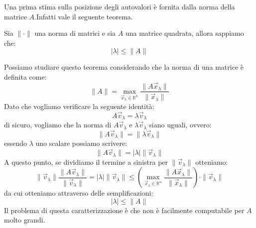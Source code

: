 Una prima stima sulla posizione degli autovalori è fornita dalla norma della
matrice $A$.Infatti vale il seguente teorema.
\begin{teorema}
    Sia $\|\cdot\|$ una norma di matrici e sia $A$ una matrice quadrata, allora
    sappiamo che:
    \begin{equation*}
        |\lambda| \leq \|A\|
    \end{equation*}
\end{teorema}
Possiamo studiare questo teorema considerando che la norma di una matrice è
definita come:
\begin{equation*}
    \|A\| = \max_{\vec{x}_\lambda \in \mathbb{R}^n} \frac{\|A\vec{x}_\lambda\|}{\|\vec{x}_\lambda\|}
\end{equation*}
Dato che vogliamo verificare la seguente identità:
\begin{equation*}
    A\vec{v}_\lambda = \lambda \vec{v}_\lambda
\end{equation*}
di sicuro, vogliamo che la norma di $A \vec{v}_\lambda$ e $\lambda \vec{v}_\lambda$
siano uguali, ovvero:
\begin{equation*}
    \|A\vec{v}_\lambda\| = \|\lambda \vec{v}_\lambda\|
\end{equation*}
essendo $\lambda$ uno scalare possiamo scrivere:
\begin{equation*}
    \|A\vec{v}_\lambda\| = |\lambda| \|\vec{v}_\lambda\|
\end{equation*}
A questo punto, se dividiamo il termine a sinistra per $\|\vec{v}_\lambda\|$ otteniamo:
\begin{equation*}
    \|\vec{v}_\lambda\| \frac{\|A\vec{v}_\lambda\|}{\|\vec{v}_\lambda\|} = |\lambda| \|\vec{v}_\lambda\|
    \leq \left(\max_{\vec{x}_\lambda \in \mathbb{R}^n} \frac{\|A\vec{x}_\lambda\|}{\|\vec{x}_\lambda\|}\right) \cdot \|\vec{v}_\lambda\|
\end{equation*}
da cui otteniamo attraverso delle semplificazioni:
\begin{equation*}
    |\lambda| \leq \|A\|
\end{equation*}
Il problema di questa caratterizzazione è che non è facilmente computabile per
$A$ molto grandi.
